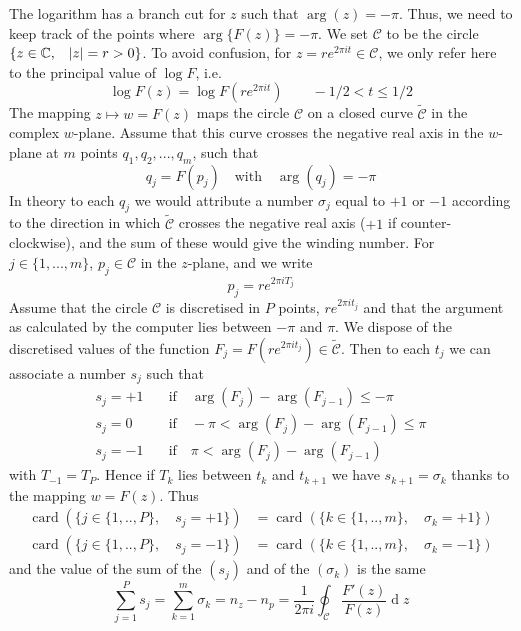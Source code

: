 \documentclass[11pt]{report}
\numberwithin{equation}{section}
\begin{document}
The logarithm has a branch cut for $z$ such that $\operatorname{arg}(z) = - \pi$. Thus, we need to keep track of the points where $\operatorname{arg}\{F(z)\} = - \pi$.  We set $\mathcal{C}$ to be the circle $\{ z \in \mathbb{C}, \quad \abs{z} = r > 0 \}$. To avoid confusion, for $z = r e^{2 \pi i t} \in \mathcal{C}$, we only refer here to the principal value of $\log F$, i.e.
%
\begin{equation}
    \log F(z) = \log F(r e^{2 \pi i t}) \quad \textrm{} \quad -1/2 < t \leq 1/2
\end{equation}
%
The mapping $z \mapsto w = F(z)$ maps the circle $\mathcal{C}$ on a closed curve $\mathcal{\tilde{C}}$ in the complex $w$-plane. Assume that this curve crosses the negative real axis in the $w$-plane at $m$ points $q_1, q_2, ..., q_m$, such that
%
\begin{equation}
    q_j = F(p_j) \quad \textrm{with} \quad \operatorname{arg}(q_j) = - \pi
\end{equation}
%
In theory to each $q_j$ we would attribute a number $\sigma_j$ equal to $+1$ or $-1$ according to the direction in which $\mathcal{\tilde{C}}$ crosses the negative real axis ($+1$ if counter-clockwise), and the sum of these would give the winding number. For $j \in \{1,...,m\}$, $p_j \in \mathcal{C}$ in the $z$-plane, and we write
%
\begin{equation}
    p_j = r e^{2 \pi i T_j}
\end{equation}
%
Assume that the circle $\mathcal{C}$ is discretised in $P$ points, $r e^{2 \pi i t_j}$ and that the argument as calculated by the computer lies between $-\pi$ and $\pi$. We dispose of the discretised values of the function $F_j = F(r e^{2 \pi i t_j}) \in \mathcal{\tilde{C}}$. Then to each $t_j$ we can associate a number $s_j$ such that
%
\begin{align*}
    s_j = + 1 \quad &\textrm{if} \quad \operatorname{arg}(F_j) -   \operatorname{arg}(F_{j-1}) \leq -\pi\\
    s_j = 0 \quad &\textrm{if} \quad  -\pi < \operatorname{arg}(F_j) -   \operatorname{arg}(F_{j-1}) \leq \pi\\
    s_j = - 1 \quad &\textrm{if} \quad \pi < \operatorname{arg}(F_j) -   \operatorname{arg}(F_{j-1})
\end{align*}
%
with $T_{-1} = T_P$. Hence if $T_k$ lies between $t_k$ and $t_{k+1}$ we have $s_{k+1} = \sigma_k$ thanks to the mapping $w = F(z)$. Thus 
%
\begin{align*}
    \operatorname{card}(\{j \in \{1,..,P\}, \quad s_j = +1\})&=\operatorname{card}(\{k \in \{1,..,m\}, \quad \sigma_k = +1\}) \\
    \operatorname{card}(\{j \in \{1,..,P\}, \quad s_j = -1\})&=\operatorname{card}(\{k \in \{1,..,m\}, \quad \sigma_k = -1\})
\end{align*}
%
and the value of the sum of the $(s_j)$ and of the $(\sigma_k)$ is the same
%
\begin{equation}
    \sum_{j=1}^P s_j = \sum_{k=1}^m \sigma_k =  n_z - n_p =\frac{1}{2 \pi i}\oint_{\mathcal{C}} \frac{F'(z)}{F(z)} \operatorname{d}z
\end{equation}
%
\end{document}

